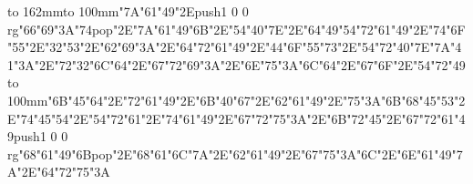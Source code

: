 \hbox to 162mm{\hsize=69mm\vbox to 100mm{\vfill\ipa\char"7A\ipa\char"61\ipa\char"49\ipa\char"2E\pdfcolorstack\match push{1 0 0 rg}\ipa\char"66\ipa\char"69\ipa\char"3A\ipa\char"74\pdfcolorstack\match pop{}\ipa\char"2E\ipa\char"7A\ipa\char"61\ipa\char"49\ipa\char"6B\ipa\char"2E\ipa\char"54\ipa\char"40\ipa\char"7E\ipa\char"2E\ipa\char"64\ipa\char"49\medskip\ipa\char"54\ipa\char"72\ipa\char"61\ipa\char"49\ipa\char"2E\ipa\char"74\ipa\char"6F\ipa\char"55\ipa\char"2E\ipa\char"32\ipa\char"53\ipa\char"2E\ipa\char"62\ipa\char"69\ipa\char"3A\ipa\char"2E\ipa\char"64\ipa\char"72\ipa\char"61\ipa\char"49\ipa\char"2E\ipa\char"44\ipa\char"6F\ipa\char"55\ipa\char"73\ipa\char"2E\ipa\char"54\ipa\char"72\ipa\char"40\ipa\char"7E\medskip\ipa\char"7A\ipa\char"41\ipa\char"3A\ipa\char"2E\ipa\char"72\ipa\char"32\ipa\char"6C\ipa\char"64\ipa\char"2E\ipa\char"67\ipa\char"72\ipa\char"69\ipa\char"3A\ipa\char"2E\ipa\char"6E\ipa\char"75\ipa\char"3A\ipa\char"6C\ipa\char"64\ipa\char"2E\ipa\char"67\ipa\char"6F\ipa\char"2E\ipa\char"54\ipa\char"72\ipa\char"49\vfill}\hfill\vbox to 100mm{\vfill\ipa\char"6B\ipa\char"45\ipa\char"64\ipa\char"2E\ipa\char"72\ipa\char"61\ipa\char"49\ipa\char"2E\ipa\char"6B\ipa\char"40\ipa\char"67\ipa\char"2E\ipa\char"62\ipa\char"61\ipa\char"49\ipa\char"2E\ipa\char"75\ipa\char"3A\ipa\char"6B\medskip\ipa\char"68\ipa\char"45\ipa\char"53\ipa\char"2E\ipa\char"74\ipa\char"45\ipa\char"54\ipa\char"2E\ipa\char"54\ipa\char"72\ipa\char"61\ipa\char"2E\ipa\char"74\ipa\char"61\ipa\char"49\ipa\char"2E\ipa\char"67\ipa\char"72\ipa\char"75\ipa\char"3A\ipa\char"2E\ipa\char"6B\ipa\char"72\ipa\char"45\ipa\char"2E\ipa\char"67\ipa\char"72\ipa\char"61\ipa\char"49\medskip\pdfcolorstack\match push{1 0 0 rg}\ipa\char"68\ipa\char"61\ipa\char"49\ipa\char"6B\pdfcolorstack\match pop{}\ipa\char"2E\ipa\char"68\ipa\char"61\ipa\char"6C\ipa\char"7A\ipa\char"2E\ipa\char"62\ipa\char"61\ipa\char"49\ipa\char"2E\ipa\char"67\ipa\char"75\ipa\char"3A\ipa\char"6C\ipa\char"2E\ipa\char"6E\ipa\char"61\ipa\char"49\ipa\char"7A\ipa\char"2E\ipa\char"64\ipa\char"72\ipa\char"75\ipa\char"3A\vfill}}\eject
